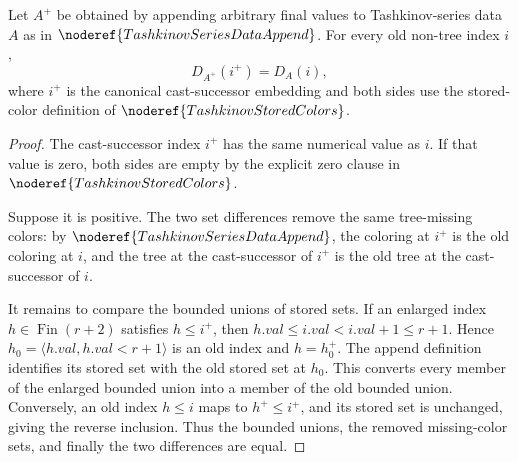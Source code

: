 \begin{lemma}
Let \(A^+\) be obtained by appending arbitrary final values to Tashkinov-series
data \(A\) as in \(\noderef{TashkinovSeriesDataAppend}\).  For every old
non-tree index \(i\),
\[
  D_{A^+}(i^+)=D_A(i),
\]
where \(i^+\) is the canonical cast-successor embedding and both sides use
the stored-color definition of \(\noderef{TashkinovStoredColors}\).
\end{lemma}
\begin{proof}
The cast-successor index \(i^+\) has the same numerical value as \(i\).  If
that value is zero, both sides are empty by the explicit zero clause in
\(\noderef{TashkinovStoredColors}\).

Suppose it is positive.  The two set differences remove the same tree-missing
colors: by \(\noderef{TashkinovSeriesDataAppend}\), the coloring at \(i^+\)
is the old coloring at \(i\), and the tree at the cast-successor of \(i^+\)
is the old tree at the cast-successor of \(i\).

It remains to compare the bounded unions of stored sets.  If an enlarged
index \(h\in\operatorname{Fin}(r+2)\) satisfies \(h\leq i^+\), then
\(h.val\leq i.val<i.val+1\leq r+1\).  Hence
\(h_0=\langle h.val,h.val<r+1\rangle\) is an old index and
\(h=h_0^+\).  The append definition identifies its stored set with the old
stored set at \(h_0\).  This converts every member of the enlarged bounded
union into a member of the old bounded union.  Conversely, an old index
\(h\leq i\) maps to \(h^+\leq i^+\), and its stored set is unchanged, giving
the reverse inclusion.  Thus the bounded unions, the removed missing-color
sets, and finally the two differences are equal.
\end{proof}

